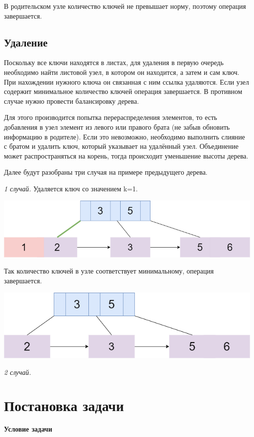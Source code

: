 \documentclass{article}
\begin{document}
В родительском узле количество ключей не превышает норму, поэтому операция завершается.

\subsection{Удаление}
  Поскольку все ключи находятся в листах, для удаления в первую очередь необходимо найти листовой узел, в котором он находится, а затем и сам ключ. При нахождении нужного ключа он связанная с ним ссылка удаляются. Если узел содержит минимальное количество ключей операция завершается. В противном случае нужно провести балансировку дерева.

  Для этого производится попытка перераспределения элементов, то есть добавления в узел элемент из левого или правого брата (не забыв обновить информацию в родителе). Если это невозможно, необходимо выполнить слияние с братом и удалить ключ, который указывает на удалённый узел. Объединение может распространяться на корень, тогда происходит уменьшение высоты дерева.

   Далее будут разобраны три случая на примере предыдущего дерева.

   \textit{1 случай.} Удаляется ключ со значением k=1.

   \includegraphics[scale=0.4]{bdel1.png}

   Так количество ключей в узле соответствует минимальному, операция завершается.
   
   \includegraphics[scale=0.4]{bdel2.png}

   \textit{2 случай.}
 
\section{Постановка задачи}
\textbf{Условие задачи} 
\end{document}
